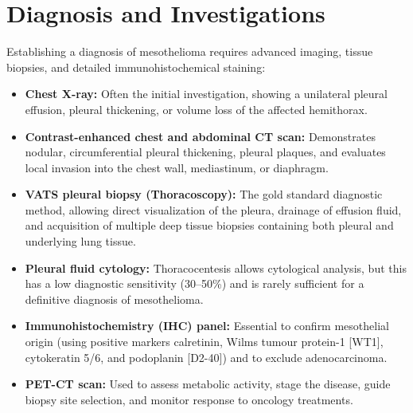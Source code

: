 \section*{Diagnosis and Investigations}
Establishing a diagnosis of mesothelioma requires advanced imaging, tissue biopsies, and detailed immunohistochemical staining:
\begin{itemize}
    \item \textbf{Chest X-ray:} Often the initial investigation, showing a unilateral pleural effusion, pleural thickening, or volume loss of the affected hemithorax.
    \item \textbf{Contrast-enhanced chest and abdominal CT scan:} Demonstrates nodular, circumferential pleural thickening, pleural plaques, and evaluates local invasion into the chest wall, mediastinum, or diaphragm.
    \item \textbf{VATS pleural biopsy (Thoracoscopy):} The gold standard diagnostic method, allowing direct visualization of the pleura, drainage of effusion fluid, and acquisition of multiple deep tissue biopsies containing both pleural and underlying lung tissue.
    \item \textbf{Pleural fluid cytology:} Thoracocentesis allows cytological analysis, but this has a low diagnostic sensitivity (30--50\%) and is rarely sufficient for a definitive diagnosis of mesothelioma.
    \item \textbf{Immunohistochemistry (IHC) panel:} Essential to confirm mesothelial origin (using positive markers calretinin, Wilms tumour protein-1 [WT1], cytokeratin 5/6, and podoplanin [D2-40]) and to exclude adenocarcinoma.
    \item \textbf{PET-CT scan:} Used to assess metabolic activity, stage the disease, guide biopsy site selection, and monitor response to oncology treatments.
\end{itemize}


